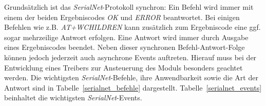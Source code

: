                 Grundsätzlich ist das \emph{SerialNet}-Protokoll synchron: Ein Befehl wird immer mit einem der beiden 
                Ergebniscodes \emph{OK} und \emph{ERROR} beantwortet. Bei einigen Befehlen wie z.B. \emph{AT+WCHILDREN}
                kann zusätzlich zum Ergebniscode eine ggf. sogar mehrzeilige Antwort erfolgen. Eine Antwort wird immer
                durch Ausgabe eines Ergebniscodes beendet. Neben dieser synchronen Befehl-Antwort-Folge können jedoch
                jederzeit auch asynchrone Events auftreten. Hierauf muss bei der Entwicklung eines Treibers zur 
                Ansteuerung des Moduls besonders geachtet werden. Die wichtigsten \emph{SerialNet}-Befehle, ihre
                Anwendbarkeit sowie die Art der Antwort sind in Tabelle~\ref{serialnet_befehle} dargestellt.
                Tabelle~\ref{serialnet_events} beinhaltet die wichtigsten \emph{SerialNet}-Events.

